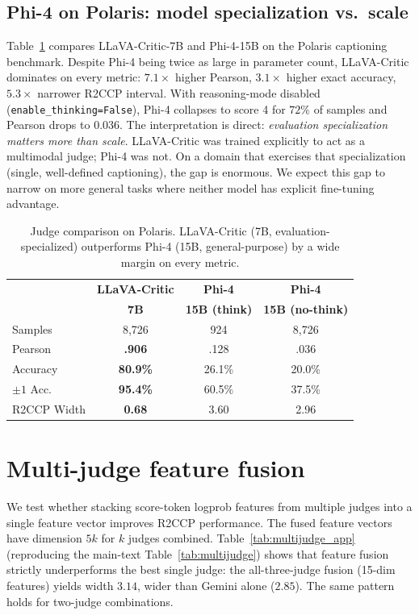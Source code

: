 \documentclass{article}
\begin{document}
\subsection{Phi-4 on Polaris: model specialization vs.\ scale}
\label{app:phi4_polaris}

Table~\ref{tab:phi4_polaris} compares LLaVA-Critic-7B and Phi-4-15B on the Polaris captioning benchmark. Despite Phi-4 being twice as large in parameter count, LLaVA-Critic dominates on every metric: $7.1\times$ higher Pearson, $3.1\times$ higher exact accuracy, $5.3\times$ narrower R2CCP interval. With reasoning-mode disabled (\texttt{enable\_thinking=False}), Phi-4 collapses to score 4 for $72\%$ of samples and Pearson drops to $0.036$. The interpretation is direct: \emph{evaluation specialization matters more than scale}. LLaVA-Critic was trained explicitly to act as a multimodal judge; Phi-4 was not. On a domain that exercises that specialization (single, well-defined captioning), the gap is enormous. We expect this gap to narrow on more general tasks where neither model has explicit fine-tuning advantage.

\begin{table}[t]
\centering
\caption{Judge comparison on Polaris. LLaVA-Critic (7B, evaluation-specialized) outperforms Phi-4 (15B, general-purpose) by a wide margin on every metric.}
\label{tab:phi4_polaris}
\small
\begin{tabular}{lccc}
\toprule
& \textbf{LLaVA-Critic} & \textbf{Phi-4} & \textbf{Phi-4} \\
& \textbf{7B} & \textbf{15B (think)} & \textbf{15B (no-think)} \\
\midrule
Samples & 8{,}726 & 924 & 8{,}726 \\
Pearson & \textbf{.906} & .128 & .036 \\
Accuracy & \textbf{80.9\%} & 26.1\% & 20.0\% \\
$\pm 1$ Acc. & \textbf{95.4\%} & 60.5\% & 37.5\% \\
R2CCP Width & \textbf{0.68} & 3.60 & 2.96 \\
\bottomrule
\end{tabular}
\end{table}

\section{Multi-judge feature fusion}
\label{app:multijudge_full}

We test whether stacking score-token logprob features from multiple judges into a single feature vector improves R2CCP performance. The fused feature vectors have dimension $5k$ for $k$ judges combined. Table~\ref{tab:multijudge_app} (reproducing the main-text Table~\ref{tab:multijudge}) shows that feature fusion strictly underperforms the best single judge: the all-three-judge fusion (15-dim features) yields width $3.14$, wider than Gemini alone ($2.85$). The same pattern holds for two-judge combinations.
\end{document}
